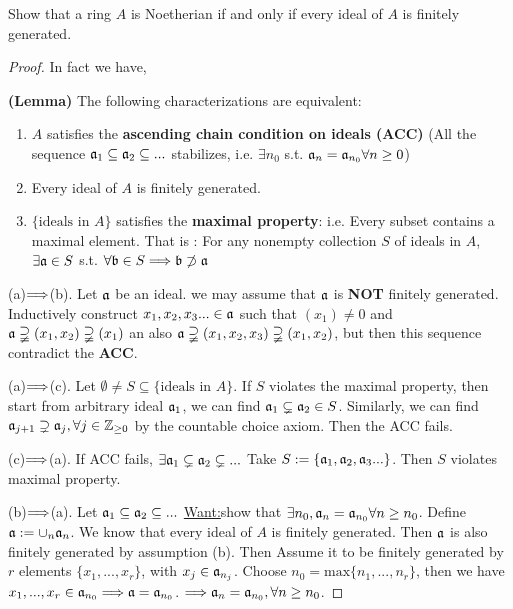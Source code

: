 \documentclass[11pt,fleqn]{book}
\begin{document}
\begin{exr}
Show that a ring $A$ is Noetherian if and only if every ideal of $A$ is finitely generated.
\end{exr}
\begin{proof}
In fact we have,

\textbf{(Lemma)} The following characterizations are equivalent:
\begin{enumerate}[label=(\alph*)]
\item ${A}$ satisfies the \textbf{ascending chain condition on ideals (ACC)} (All the sequence ${\mathfrak a}_1\subseteq {\mathfrak a}_2\subseteq ...$ stabilizes, i.e. $\exists n_0$ s.t. ${\mathfrak a}_n={\mathfrak a}_{n_0} \forall n\geq 0$)
\item Every ideal of ${A}$ is finitely generated.
\item $\{\text{ideals in ${A}$}\}$ satisfies the \textbf{maximal property}: i.e. Every subset contains a maximal element. That is : For any nonempty collection $S$ of ideals in ${A}$, $\exists {\mathfrak a}\in S$ s.t. $\forall {\mathfrak b}\in S\Longrightarrow {\mathfrak b}\not \supset {\mathfrak a}$
\end{enumerate}

(a)$\Longrightarrow$(b). Let ${\mathfrak a}$ be an ideal. we may assume that ${\mathfrak a}$ is \textbf{NOT} finitely generated. Inductively construct $x_1, x_2,x_3...\in {\mathfrak a}$ such that $(x_1)\neq 0$ and ${\mathfrak a}\supsetneqq(x_1,x_2)\supsetneqq(x_1)$ an also ${\mathfrak a}\supsetneqq(x_1,x_2,x_3)\supsetneqq(x_1,x_2)$, but then this sequence contradict the \textbf{ACC}.

(a)$\Longrightarrow$(c). Let $\emptyset \neq S\subseteq \{\text{ideals in }{A}\}$. If $S$ violates the maximal property, then start from arbitrary ideal ${\mathfrak a}_1$, we can find ${\mathfrak a}_1\subsetneq {\mathfrak a}_2\in S$. Similarly, we can find ${\mathfrak a}_{j+1}\supsetneq {\mathfrak a}_j,\forall j\in\mathbb Z_{\geq 0}$ by the countable choice axiom. Then the ACC fails.

(c)$\Longrightarrow $(a). If ACC fails, $\exists {\mathfrak a}_1\subsetneq {\mathfrak a}_2\subsetneq ...$ Take $S:=\{{\mathfrak a}_1,{\mathfrak a}_2,{\mathfrak a}_3...\}$. Then $S$ violates maximal property.

(b)$\Longrightarrow$(a). Let ${\mathfrak a}_1\subseteq{\mathfrak a}_2\subseteq ...$ \underline{Want:}show that $\exists n_0,{\mathfrak a}_n={\mathfrak a}_{n_0}\forall n\geq n_0$.
Define ${\mathfrak a}:=\cup_n {\mathfrak a}_n$. We know that every ideal of ${A}$ is finitely generated. Then ${\mathfrak a}$ is also finitely generated by assumption (b). Then Assume it to be finitely generated by $r$ elements $\{x_1,...,x_r\}$, with $x_j\in{\mathfrak a}_{n_j}$. Choose $n_0=\text{max}\{n_1,...,n_r\}$, then we have $x_1,...,x_r\in {\mathfrak a}_{n_0}\Longrightarrow {\mathfrak a}={\mathfrak a}_{n_0}$. $\Longrightarrow {\mathfrak a}_n={\mathfrak a}_{n_0},\forall n\geq n_0$.
\end{proof}
\end{document}
